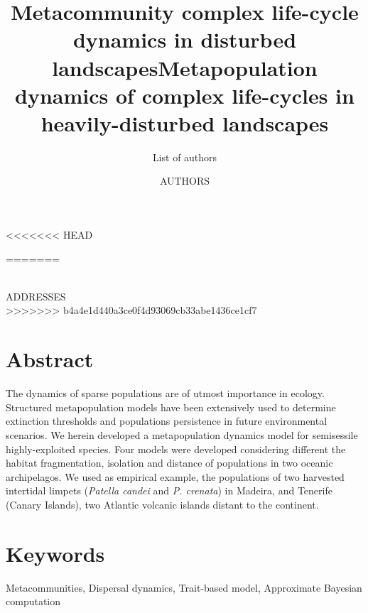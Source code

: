 \documentclass[12pt]{article}
\date{}
\begin{document}
<<<<<<< HEAD
\title{Metacommunity complex life-cycle dynamics in disturbed landscapes}
\author{List of authors}


\maketitle

=======
\begin{flushleft}
\title{Metapopulation dynamics of complex life-cycles in heavily-disturbed landscapes}
\maketitle
\author{AUTHORS}
\\
\small{ADDRESSES}
\\
\doublespacing
>>>>>>> b4a4e1d440a3ce0f4d93069cb33abe1436ce1cf7
\section{Abstract}
The dynamics of sparse populations are of utmost importance in
ecology. Structured metapopulation models have been extensively used
to determine extinction thresholds and populations persistence in
future environmental scenarios. We herein developed a metapopulation
dynamics model for semisessile highly-exploited species. Four models
were developed considering different the habitat fragmentation,
isolation and distance of populations in two oceanic archipelagos. We
used as empirical example, the populations of two harvested intertidal
limpets (\textit{Patella candei} and \textit{P. crenata}) in Madeira,
and Tenerife (Canary Islands), two Atlantic volcanic islands distant
to the continent.

\section{Keywords}
Metacommunities, Dispersal dynamics, Trait-based model, Approximate Bayesian computation


\end{flushleft}
\end{document}
